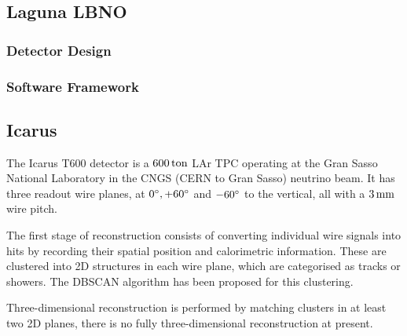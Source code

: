 \subsection{Laguna LBNO}

\subsubsection{Detector Design}
\subsubsection{Software Framework}

\subsection{Icarus}
The Icarus T600 detector is a $600\,\mathrm{ton}$ \acs{LAr TPC} operating at the Gran Sasso National Laboratory in the CNGS (CERN to Gran Sasso) neutrino beam. It has three readout wire planes, at $0^\circ, +60^\circ$ and $-60^\circ$ to the vertical, all with a $3\,\mathrm{mm}$ wire pitch.

The first stage of reconstruction consists of converting individual wire signals into hits by recording their spatial position and calorimetric information. These are clustered into 2D structures in each wire plane, which are categorised as tracks or showers. The DBSCAN algorithm has been proposed for this clustering.

Three-dimensional reconstruction is performed by matching clusters in at least two 2D planes, there is no fully three-dimensional reconstruction at present.

